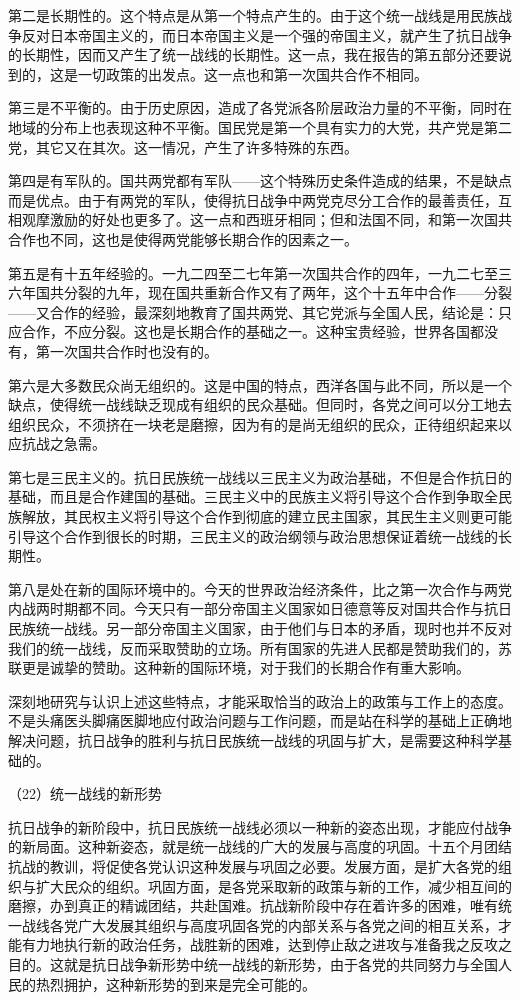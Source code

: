 \documentclass[UTF8, 12pt, a4paper]{ctexrep}
\begin{document}
第二是长期性的。这个特点是从第一个特点产生的。由于这个统一战线是用民族战争反对日本帝国主义的，而日本帝国主义是一个强的帝国主义，就产生了抗日战争的长期性，因而又产生了统一战线的长期性。这一点，我在报告的第五部分还要说到的，这是一切政策的出发点。这一点也和第一次国共合作不相同。

第三是不平衡的。由于历史原因，造成了各党派各阶层政治力量的不平衡，同时在地域的分布上也表现这种不平衡。国民党是第一个具有实力的大党，共产党是第二党，其它又在其次。这一情况，产生了许多特殊的东西。

第四是有军队的。国共两党都有军队——这个特殊历史条件造成的结果，不是缺点而是优点。由于有两党的军队，使得抗日战争中两党克尽分工合作的最善责任，互相观摩激励的好处也更多了。这一点和西班牙相同；但和法国不同，和第一次国共合作也不同，这也是使得两党能够长期合作的因素之一。

第五是有十五年经验的。一九二四至二七年第一次国共合作的四年，一九二七至三六年国共分裂的九年，现在国共重新合作又有了两年，这个十五年中合作——分裂——又合作的经验，最深刻地教育了国共两党、其它党派与全国人民，结论是：只应合作，不应分裂。这也是长期合作的基础之一。这种宝贵经验，世界各国都没有，第一次国共合作时也没有的。

第六是大多数民众尚无组织的。这是中国的特点，西洋各国与此不同，所以是一个缺点，使得统一战线缺乏现成有组织的民众基础。但同时，各党之间可以分工地去组织民众，不须挤在一块老是磨擦，因为有的是尚无组织的民众，正待组织起来以应抗战之急需。

第七是三民主义的。抗日民族统一战线以三民主义为政治基础，不但是合作抗日的基础，而且是合作建国的基础。三民主义中的民族主义将引导这个合作到争取全民族解放，其民权主义将引导这个合作到彻底的建立民主国家，其民生主义则更可能引导这个合作到很长的时期，三民主义的政治纲领与政治思想保证着统一战线的长期性。

第八是处在新的国际环境中的。今天的世界政治经济条件，比之第一次合作与两党内战两时期都不同。今天只有一部分帝国主义国家如日德意等反对国共合作与抗日民族统一战线。另一部分帝国主义国家，由于他们与日本的矛盾，现时也并不反对我们的统一战线，反而采取赞助的立场。所有国家的先进人民都是赞助我们的，苏联更是诚挚的赞助。这种新的国际环境，对于我们的长期合作有重大影响。

深刻地研究与认识上述这些特点，才能采取恰当的政治上的政策与工作上的态度。不是头痛医头脚痛医脚地应付政治问题与工作问题，而是站在科学的基础上正确地解决问题，抗日战争的胜利与抗日民族统一战线的巩固与扩大，是需要这种科学基础的。

（22）统一战线的新形势

抗日战争的新阶段中，抗日民族统一战线必须以一种新的姿态出现，才能应付战争的新局面。这种新姿态，就是统一战线的广大的发展与高度的巩固。十五个月团结抗战的教训，将促使各党认识这种发展与巩固之必要。发展方面，是扩大各党的组织与扩大民众的组织。巩固方面，是各党采取新的政策与新的工作，减少相互间的磨擦，办到真正的精诚团结，共赴国难。抗战新阶段中存在着许多的困难，唯有统一战线各党广大发展其组织与高度巩固各党的内部关系与各党之间的相互关系，才能有力地执行新的政治任务，战胜新的困难，达到停止敌之进攻与准备我之反攻之目的。这就是抗日战争新形势中统一战线的新形势，由于各党的共同努力与全国人民的热烈拥护，这种新形势的到来是完全可能的。
\end{document}

